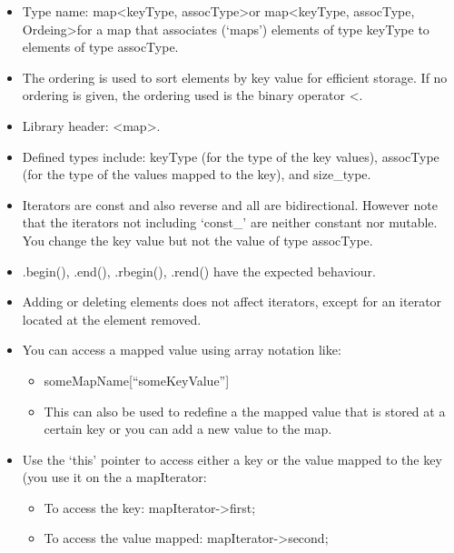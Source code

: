 \begin{itemize}
	\item Type name: map\textless keyType, assocType\textgreater or
	map\textless keyType, assocType, Ordeing\textgreater for a map that associates
	(`maps') elements of type keyType to elements of type assocType.
	\item The ordering is used to sort elements by key value for efficient storage. If no
	ordering is given, the ordering used is the binary operator \textless.
	\item Library header: \textless map\textgreater.
	\item Defined types include: keyType (for the type of the key values), assocType
	(for the type of the values mapped to the key), and size\_type.
	\item Iterators are const and also reverse and all are bidirectional. However note that
	the iterators not including `const\_' are neither constant nor mutable. You change the
	key value but not the value of type assocType.
	\item .begin(), .end(), .rbegin(), .rend() have the expected behaviour.
	\item Adding or deleting elements does not affect iterators, except for an iterator
	located at the element removed.
	\item You can access a mapped value using array notation like:
	\begin{itemize}
		\item someMapName[``someKeyValue'']
		\item This can also be used to redefine a the mapped value that is stored
		at a certain key or you can add a new value to the map.
	\end{itemize}
	\item Use the `this' pointer to access either a key or the value mapped to the key
	(you use it on the a mapIterator:
	\begin{itemize}
		\item To access the key: mapIterator-\textgreater first;
		\item To access the value mapped: mapIterator-\textgreater second;
	\end{itemize}
\end{itemize}

